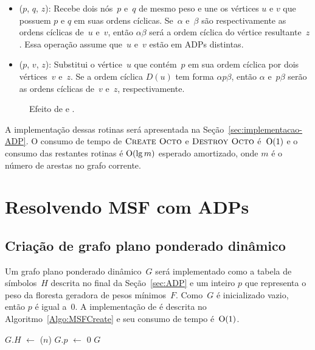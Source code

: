 \begin{itemize}
\item \LCOMerge($p$, $q$, $z$): Recebe dois nós~$p$ e~$q$ de mesmo peso e une os vértices $u$ e $v$ que possuem $p$ e $q$ em suas ordens cíclicas.
Se~$\alpha$ e~$\beta$ são respectivamente as ordens cíclicas de~$u$ e~$v$, então $\alpha\beta$ será a ordem cíclica do vértice resultante~$z$. 
Essa operação assume que~$u$ e~$v$ estão em ADPs distintas.

\item \LCOSplit($p$, $v$, $z$): Substitui o vértice~$u$ que contém~$p$ em sua ordem cíclica por dois vértices~$v$ e~$z$.
Se a ordem cíclica $D(u)$ tem forma $\alpha p\beta$, então $\alpha$ e~$p\beta$ serão as ordens cíclicas de~$v$ e~$z$, respectivamente.

\end{itemize}
\begin{figure}[htb]
\scalebox{1}{
\centering

}
\caption{Efeito de \LCOMerge{} e \LCOSplit{}.}
\label{fig:MSF-Merge-Split}
\end{figure}



A implementação dessas rotinas será apresentada na Seção~\ref{sec:implementacao-ADP}.
O consumo de tempo de $\text{\scshape Create Octo}$ e $\text{\scshape Destroy Octo}$ é~$\mathrm{O}(1)$ e o consumo das restantes rotinas é $\mathrm{O}(\lg m)$ esperado amortizado, onde $m$ é o número de arestas no grafo corrente.

\section{Resolvendo MSF com ADPs}
\label{sec:MSFcomADPs}

\subsection{Criação de grafo plano ponderado dinâmico}

Um grafo plano ponderado dinâmico~$G$ será implementado como a tabela de símbolos~$H$ descrita no final da Seção~\ref{sec:ADP} e um inteiro $p$ que representa o peso da floresta geradora de pesos mínimos~$F$.
Como~$G$ é inicializado vazio, então $p$ é igual a~$0$.
A implementação de \MSFCreate{} é descrita no Algoritmo~\ref{Algo:MSFCreate} e seu consumo de tempo é~$\mathrm{O}(1)$.

\begin{algorithm}[htb]
\caption{\MSFCreate($n$)}
\label{Algo:MSFCreate}
\begin{algorithmic}[1]
\State $G.H$ $\gets$ \hashCreate($n$)
\State $G.p$ $\gets$ $0$
\State \Return $G$
\end{algorithmic}
\end{algorithm}

